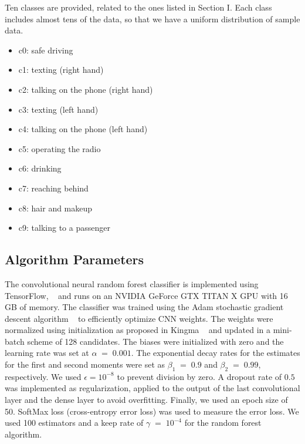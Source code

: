 \documentclass[conference,compsoc]{IEEEtran}
\begin{document}
Ten classes are provided, related to the ones listed in Section I. Each class includes almost tens of the data, so that we have a uniform distribution of sample data.

\begin{itemize}
  \item \relax c0: safe driving
  \item \relax c1: texting (right hand)
  \item \relax c2: talking on the phone (right hand)
  \item \relax c3: texting (left hand)
  \item \relax c4: talking on the phone (left hand)
  \item \relax c5: operating the radio
  \item \relax c6: drinking
  \item \relax c7: reaching behind
  \item \relax c8: hair and makeup
  \item \relax c9: talking to a passenger
\end{itemize}
  


\subsection{Algorithm Parameters}The convolutional neural random forest classifier is implemented using TensorFlow, \unskip~\cite{1641075:26775853} and runs on an NVIDIA GeForce GTX TITAN X GPU with 16 GB of memory. The classifier was trained using the Adam stochastic gradient descent algorithm \unskip~\cite{1641075:26775857} to efficiently optimize CNN weights. The weights were normalized using initialization as proposed in Kingma \unskip~\cite{1641075:26775857} and updated in a mini-batch scheme of 128 candidates. The biases were initialized with zero and the learning rate was set at $\alpha\;=\;0.001 $. The exponential decay rates for the estimates for the first and second moments were set as $\beta_1\;=\;0.9 $ and $\beta_2\;=\;0.99 $, respectively. We used $\epsilon={10}^{-8} $ to prevent division by zero. A dropout rate of $0.5 $ was implemented as regularization, applied to the output of the last convolutional layer and the dense layer to avoid overfitting. Finally, we used an epoch size of 50.  SoftMax loss (cross-entropy error loss) was used to measure the error loss. We used 100 estimators and a keep rate of $\gamma\;=\;{10}^{-4} $ for the random forest algorithm.
\end{document}
